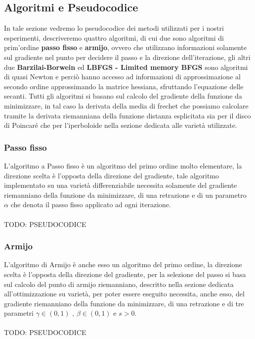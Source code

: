 \documentclass[a4paper, 12pt]{article}
\begin{document}
\subsection{Algoritmi e Pseudocodice}
In tale sezione vedremo lo pseudocodice dei metodi utilizzati per i nostri esperimenti, descriveremo quattro algoritmi, di cui due sono algoritmi di prim'ordine \textbf{passo fisso} e \textbf{armijo}, ovvero che utilizzano informazioni solamente sul gradiente nel punto per decidere il passo e la direzione dell'iterazione, gli altri due \textbf{Barzilai-Borwein} ed \textbf{LBFGS - Limited memory BFGS} sono algoritmi di quasi Newton e perciò hanno accesso ad informazioni di approssimazione al secondo ordine approssimando la matrice hessiana, sfruttando l'equazione delle secanti. Tutti gli algoritmi si basano sul calcolo del gradiente della funzione da minimizzare, in tal caso la derivata della media di frechet che possiamo calcolare tramite la derivata riemanniana della funzione distanza esplicitata sia per il disco di Poincaré che per l'iperboloide nella sezione dedicata alle varietà utilizzate.
\subsubsection{Passo fisso}
L'algoritmo a Passo fisso è un algoritmo del primo ordine molto elementare, la direzione scelta è l'opposta della direzione del gradiente, tale algoritmo implementato su una varietà differenziabile necessita solamente del gradiente riemanniano della funzione da minimizzare, di una retrazione e di un parametro $\alpha$ che denota il passo fisso applicato ad ogni iterazione.\\\\
TODO: PSEUDOCODICE
\subsubsection{Armijo}
L'algoritmo di Armijo è anche esso un algoritmo del primo ordine, la direzione scelta è l'opposta della direzione del gradiente, per la selezione del passo si basa sul calcolo del punto di armijo riemanniano, descritto nella sezione dedicata all'ottimizzazione su varietà, per poter essere eseguito necessita, anche esso, del gradiente riemanniano della funzione da minimizzare, di una retrazione e di tre parametri $\gamma \in (0,1)$ , $\beta \in (0,1)$ e $s > 0$.\\\\
TODO: PSEUDOCODICE
\end{document}
